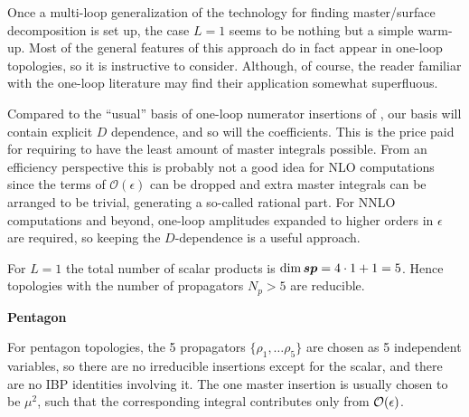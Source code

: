 Once a multi-loop generalization of the technology for finding master/surface decomposition 
is set up, the case $L=1$ seems to be nothing but a simple warm-up. 
Most of the general features of this approach do in fact appear in one-loop topologies,
so it is instructive to consider.
Although, of course, the reader familiar with the one-loop literature may find
their application somewhat superfluous.

Compared to the ``usual'' basis of one-loop numerator insertions of \cite{Ossola:2006us,Giele:2008ve},
our basis will contain explicit $D$ dependence, and so will the coefficients.
This is the price paid for requiring to have the least amount of master integrals possible.
From an efficiency perspective this is probably not a good idea for NLO computations
since the terms of $\mathcal{O}(\epsilon)$ can be dropped
and extra master integrals can be arranged to be trivial, generating a so-called rational part.
For NNLO computations and beyond, one-loop amplitudes expanded to higher orders in $\epsilon$ are required, 
so keeping the $D$-dependence is a useful approach.

For $L=1$ the total number of scalar products is $\dim{\vb*{sp}} = 4\cdot 1+ 1 = 5$.
Hence topologies with the number of propagators $N_p>5$ are reducible.


\textbf{Pentagon}

For pentagon topologies, the 5 propagators $\{\rho_1,\ldots{}\rho_5\}$ are chosen as 5 independent variables,
so there are no irreducible insertions except for the scalar, and there are no IBP identities involving it. 
The one master insertion is usually chosen to be $\mu^2$, such that
the corresponding integral contributes only from  $\order{\epsilon}$.


